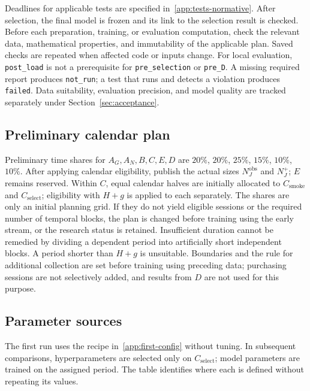 \documentclass[12pt,a4paper]{article}
\newcommand{\code}[1]{{\ttfamily\small\nolinkurl{#1}}}
\theoremstyle{plainru}
\begin{document}
Deadlines for applicable tests are specified in~\ref{app:tests-normative}.
After selection, the final model is frozen
and its link to the selection result is checked.
Before each preparation, training, or evaluation computation, check the
relevant data, mathematical properties, and immutability of the applicable plan.
Saved checks are repeated when affected code or inputs change.
For local evaluation, \code{post_load} is not a prerequisite for
\code{pre_selection} or \code{pre_D}.
A missing required report
produces \code{not_run}; a test that runs and detects a violation produces \code{failed}.
Data suitability, evaluation precision, and model quality are tracked
separately under Section~\ref{sec:acceptance}.

\subsection{Preliminary calendar plan}

Preliminary time shares for $A_G,A_N,B,C,E,D$ are
$20\%$, $20\%$, $25\%$, $15\%$, $10\%$, $10\%$.
After applying calendar eligibility, publish the actual sizes
$N_J^{\mathrm{obs}}$ and $N_J^+$; $E$ remains reserved.
Within $C$, equal calendar halves are initially allocated to
$C_{\mathrm{smoke}}$ and $C_{\mathrm{select}}$; eligibility with $H+g$
is applied to each separately. The shares are only an initial planning grid.
If they do not yield eligible sessions or the required number of temporal
blocks, the plan is changed before training using the early stream, or the
research status is retained. Insufficient duration cannot be remedied
by dividing a dependent period into artificially short independent blocks.
A period shorter than $H+g$ is unsuitable. Boundaries and the rule for additional
collection are set before training using preceding data; purchasing sessions
are not selectively added, and results from $D$ are not used for this purpose.


\subsection{Parameter sources}\label{app:parameter-roles}

The first run uses the recipe in~\ref{app:first-config} without tuning.
In subsequent comparisons, hyperparameters are selected only on
$C_{\mathrm{select}}$; model parameters are trained on the assigned period.
The table identifies where each is defined without repeating its values.
\end{document}
